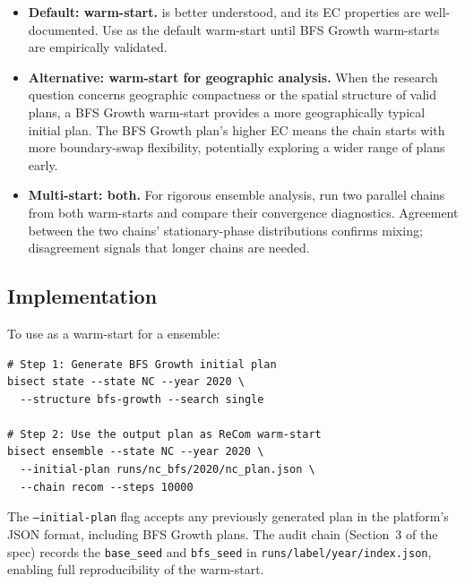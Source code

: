 \begin{itemize}
\item \textbf{Default: \metis{} warm-start.}
  \metis{} is better understood, and its EC properties are well-documented.
  Use \metis{} as the default warm-start until BFS Growth warm-starts
  are empirically validated.

\item \textbf{Alternative: \bfsg{} warm-start for geographic analysis.}
  When the research question concerns geographic compactness or the
  spatial structure of valid plans, a BFS Growth warm-start provides a
  more geographically typical initial plan.
  The BFS Growth plan's higher EC means the chain starts with more
  boundary-swap flexibility, potentially exploring a wider range of
  plans early.

\item \textbf{Multi-start: both.}
  For rigorous ensemble analysis, run two parallel chains from both
  warm-starts and compare their convergence diagnostics.
  Agreement between the two chains' stationary-phase distributions
  confirms mixing; disagreement signals that longer chains are needed.
\end{itemize}

\subsection{Implementation}

To use \bfsg{} as a warm-start for a \recom{} ensemble:

\begin{verbatim}
# Step 1: Generate BFS Growth initial plan
bisect state --state NC --year 2020 \
  --structure bfs-growth --search single

# Step 2: Use the output plan as ReCom warm-start
bisect ensemble --state NC --year 2020 \
  --initial-plan runs/nc_bfs/2020/nc_plan.json \
  --chain recom --steps 10000
\end{verbatim}

The \texttt{--initial-plan} flag accepts any previously generated plan
in the platform's JSON format, including BFS Growth plans.
The audit chain (Section~3 of the spec) records the \texttt{base\_seed}
and \texttt{bfs\_seed} in \texttt{runs/{label}/{year}/index.json},
enabling full reproducibility of the warm-start.
